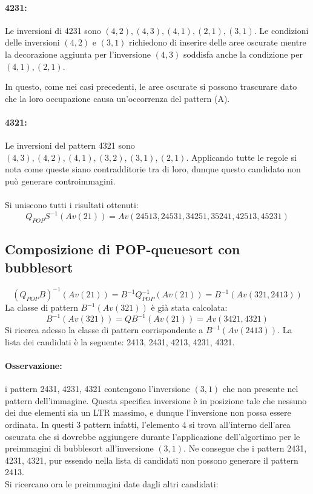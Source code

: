 \paragraph*{4231:} Le inversioni di 4231 sono $(4,2),(4,3),(4,1),(2,1),(3,1)$. Le condizioni delle inversioni $(4,2)$ e $(3,1)$ richiedono di inserire delle aree oscurate mentre la decorazione aggiunta per l'inversione $(4,3)$ soddisfa anche la condizione per $(4,1),(2,1)$.
\begin{center}
\end{center}
In questo, come nei casi precedenti, le aree oscurate si possono trascurare dato che la loro occupazione causa un'occorrenza del pattern (A).
\paragraph*{4321:} Le inversioni del pattern 4321 sono $(4,3),(4,2),(4,1),(3,2),(3,1),(2,1)$. Applicando tutte le regole si nota come queste siano contradditorie tra di loro, dunque questo candidato non pu\`o generare controimmagini.
\\\\Si uniscono tutti i risultati ottenuti:
$$Q_{POP}S^{-1}(Av(21)) = Av(24513, 24531, 34251, 35241, 42513, 45231)$$
\subsection*{Composizione di {POP-queuesort} con {bubblesort}}
$$(Q_{POP}{B})^{-1}(Av(21)) = B^{-1}Q_{POP}^{-1}(Av(21))=B^{-1}(Av(321,2413))$$
La classe di pattern $B^{-1}(Av(321))$ \`e gi\`a stata calcolata:
$$B^{-1}(Av(321)) = QB^{-1}(Av(21)) = Av(3421, 4321)$$
Si ricerca adesso la classe di pattern corrispondente a $B^{-1}(Av(2413))$. La lista dei candidati \`e la seguente: 2413, 2431, 4213, 4231, 4321.
\paragraph*{Osservazione:} i pattern 2431, 4231, 4321 contengono l'inversione $(3,1)$ che non presente nel pattern dell'immagine. Questa specifica inversione \`e in posizione tale che nessuno dei due elementi sia un LTR massimo, e dunque l'inversione non possa essere ordinata. In questi 3 pattern infatti, l'elemento 4 si trova all'interno dell'area oscurata che si dovrebbe aggiungere durante l'applicazione dell'algortimo per le preimmagini di bubblesort all'inversione $(3,1)$. Ne consegue che i pattern  2431, 4231, 4321, pur essendo nella lista di candidati non possono generare il pattern 2413.\\
Si ricercano ora le preimmagini date dagli altri candidati:

